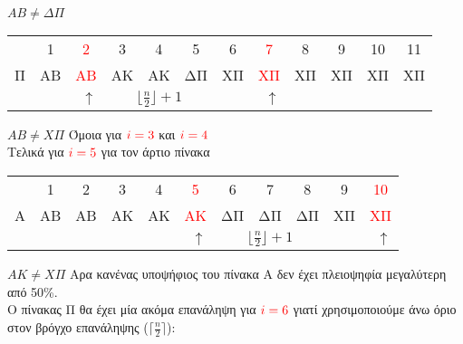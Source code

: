 \documentclass[a4paper]{article}
\begin{document}
\begin{itemize}
$AB\neq ΔΠ$

\begin{center}
\begin{tabular}{r|c|c|c|c|c|c|c|c|c|c|c|}
\multicolumn{1}{r}{} & \multicolumn{1}{c}{1} & \multicolumn{1}{c}{\textcolor{red}{2}} & \multicolumn{1}{c}{3} & \multicolumn{1}{c}{4} & \multicolumn{1}{c}{5} & \multicolumn{1}{c}{6} & \multicolumn{1}{c}{\textcolor{red}{7}} & \multicolumn{1}{c}{8} & \multicolumn{1}{c}{9} & \multicolumn{1}{c}{10} & \multicolumn{1}{c}{11}\\
\cline{2-12}
Π & ΑΒ & \textcolor{red}{ΑΒ} & ΑΚ & ΑΚ & ΔΠ & ΧΠ & \textcolor{red}{ΧΠ} & ΧΠ & ΧΠ & ΧΠ & ΧΠ \\
\cline{2-12}
\multicolumn{3}{r}{$\uparrow$} & \multicolumn{3}{c}{$\lfloor\frac{n}{2}\rfloor+1$} & \multicolumn{2}{r}{$\uparrow$}\\
\cline{3-8}
\end{tabular}
\end{center}

$AB\neq XΠ$\newline
Όμοια για $\textcolor{red}{i=3}$ και $\textcolor{red}{i=4}$\\Τελικά για $\textcolor{red}{i=5}$ για τον άρτιο πίνακα 

\begin{center}
\begin{tabular}{r|c|c|c|c|c|c|c|c|c|c|}
\multicolumn{1}{r}{} & \multicolumn{1}{c}{1} & \multicolumn{1}{c}{2} & \multicolumn{1}{c}{3} & \multicolumn{1}{c}{4} & \multicolumn{1}{c}{\textcolor{red}{5}} & \multicolumn{1}{c}{6} & \multicolumn{1}{c}{7} & \multicolumn{1}{c}{8} & \multicolumn{1}{c}{9} & \multicolumn{1}{c}{\textcolor{red}{10}}\\
\cline{2-11}
Α & ΑΒ & ΑΒ & ΑΚ & ΑΚ & \textcolor{red}{ΑΚ} & ΔΠ & ΔΠ & ΔΠ & ΧΠ & \textcolor{red}{ΧΠ}\\
\cline{2-11}
\multicolumn{6}{r}{$\uparrow$} & \multicolumn{3}{c}{$\lfloor\frac{n}{2}\rfloor+1$} & \multicolumn{2}{r}{$\uparrow$}\\
\cline{6-11}
\end{tabular}
\end{center}

$AK\neq XΠ$ Αρα κανένας υποψήφιος του πίνακα Α δεν έχει πλειοψηφία μεγαλύτερη από 50\%.\\
O πίνακας Π θα έχει μία ακόμα επανάληψη για $\textcolor{red}{i=6}$ γιατί χρησιμοποιούμε άνω όριο στον βρόγχο επανάληψης ($\lceil\frac{n}{2}\rceil$):


\end{itemize}
\end{document}
